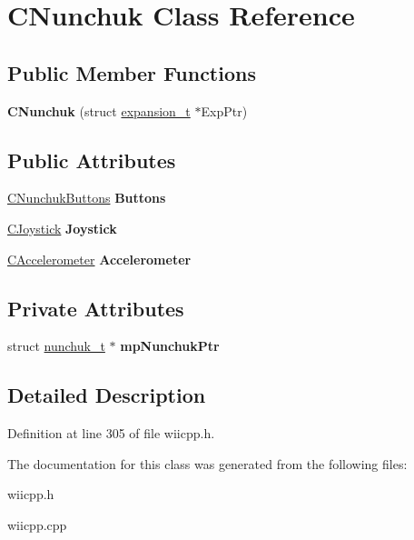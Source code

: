 \hypertarget{class_c_nunchuk}{\section{\-C\-Nunchuk \-Class \-Reference}
\label{class_c_nunchuk}
}
\subsection*{\-Public \-Member \-Functions}
\begin{DoxyCompactItemize}
\item 
\hypertarget{class_c_nunchuk_a6f4eaa8c718137b80c31bd845949eea4}{{\bfseries \-C\-Nunchuk} (struct \hyperlink{structexpansion__t}{expansion\-\_\-t} $\ast$\-Exp\-Ptr)}\label{class_c_nunchuk_a6f4eaa8c718137b80c31bd845949eea4}

\end{DoxyCompactItemize}
\subsection*{\-Public \-Attributes}
\begin{DoxyCompactItemize}
\item 
\hypertarget{class_c_nunchuk_a781de564cb6f35c885534c8f3878adf0}{\hyperlink{class_c_nunchuk_buttons}{\-C\-Nunchuk\-Buttons} {\bfseries \-Buttons}}\label{class_c_nunchuk_a781de564cb6f35c885534c8f3878adf0}

\item 
\hypertarget{class_c_nunchuk_a06c368af6b3dcef2b8b5619a4f02d5fb}{\hyperlink{class_c_joystick}{\-C\-Joystick} {\bfseries \-Joystick}}\label{class_c_nunchuk_a06c368af6b3dcef2b8b5619a4f02d5fb}

\item 
\hypertarget{class_c_nunchuk_a7644bb8821e484b421e49488bb10052d}{\hyperlink{class_c_accelerometer}{\-C\-Accelerometer} {\bfseries \-Accelerometer}}\label{class_c_nunchuk_a7644bb8821e484b421e49488bb10052d}

\end{DoxyCompactItemize}
\subsection*{\-Private \-Attributes}
\begin{DoxyCompactItemize}
\item 
\hypertarget{class_c_nunchuk_a7251cf7f531742379af0efc1fef05c92}{struct \hyperlink{structnunchuk__t}{nunchuk\-\_\-t} $\ast$ {\bfseries mp\-Nunchuk\-Ptr}}\label{class_c_nunchuk_a7251cf7f531742379af0efc1fef05c92}

\end{DoxyCompactItemize}


\subsection{\-Detailed \-Description}


\-Definition at line 305 of file wiicpp.\-h.



\-The documentation for this class was generated from the following files\-:\begin{DoxyCompactItemize}
\item 
wiicpp.\-h\item 
wiicpp.\-cpp\end{DoxyCompactItemize}
